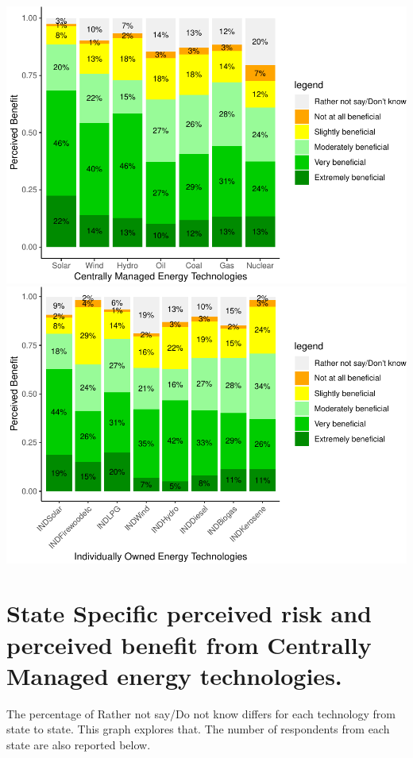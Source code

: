 \documentclass[
]{article}
\begin{document}
\includegraphics{Significant_results_files/figure-latex/unnamed-chunk-7-1.pdf}
\includegraphics{Significant_results_files/figure-latex/unnamed-chunk-7-2.pdf}

\newpage

\hypertarget{state-specific-perceived-risk-and-perceived-benefit-from-centrally-managed-energy-technologies.}{%
\section{State Specific perceived risk and perceived benefit from
Centrally Managed energy
technologies.}\label{state-specific-perceived-risk-and-perceived-benefit-from-centrally-managed-energy-technologies.}}

The percentage of Rather not say/Do not know differs for each technology
from state to state. This graph explores that. The number of respondents
from each state are also reported below.
\end{document}
